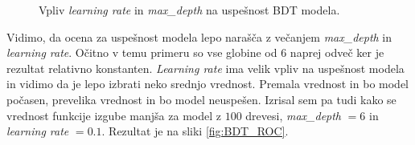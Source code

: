 \documentclass[a4paper]{article}
\begin{document}
\begin{figure}[H]
    \centering
    \caption{Vpliv \textit{learning rate} in \textit{max\_depth} na uspešnost BDT modela.}
    \label{fig:BDT_params}
\end{figure}

Vidimo, da ocena za uspešnost modela lepo narašča z večanjem \textit{max\_depth} in \textit{learning rate}. Očitno v temu 
primeru so vse globine od $6$ naprej odveč ker je rezultat relativno konstanten. \textit{Learning rate} ima velik vpliv 
na uspešnost modela in vidimo da je lepo izbrati neko srednjo vrednost. Premala vrednost in bo model počasen, prevelika
vrednost in bo model neuspešen. Izrisal sem pa tudi kako se vrednost funkcije izgube manjša za model z $100$ drevesi, 
\textit{max\_depth} $= 6$ in \textit{learning rate} $= 0.1$. Rezultat je na sliki \ref{fig:BDT_ROC}. \\
\end{document}
